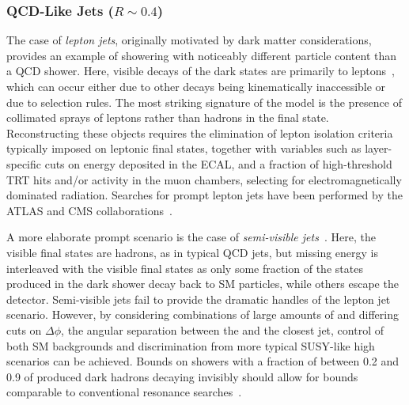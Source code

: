 \subsubsection{QCD-Like Jets ($R \sim 0.4$)} %
\label{sec:darkshowerthinjet}

The case of \emph{lepton jets}, originally motivated by dark matter considerations, provides an example of showering with noticeably different particle content than a QCD shower. Here, visible decays of the dark states are primarily to leptons~\cite{Falkowski:2010cm,Falkowski:2010gv}, which can occur either due to other decays being kinematically inaccessible or due to selection rules. The most striking signature of the model is the presence of collimated sprays of leptons rather than hadrons in the final state. Reconstructing these objects requires the elimination of lepton isolation criteria typically imposed on leptonic final states, together with variables such as layer-specific cuts on energy deposited in the ECAL, and a fraction of high-threshold TRT hits and/or activity in the muon chambers, selecting for electromagnetically dominated radiation. Searches for prompt lepton jets have been performed by the ATLAS and CMS collaborations~\cite{Chatrchyan:2011hr,Aad:2015sms}.

A more elaborate prompt scenario is the case of \emph{semi-visible jets}~\cite{Cohen:2015toa}. Here, the visible final states are hadrons, as in typical QCD jets, but missing energy is interleaved with the visible final states as only some fraction of the states produced in the dark shower decay back to SM particles, while others escape the detector. Semi-visible jets fail to provide the dramatic handles of the lepton jet scenario. However, by considering combinations of large amounts of \MET and differing cuts on $\Delta\phi$, the angular separation between the \MET and the closest jet, control of both SM backgrounds and discrimination from more typical SUSY-like high \MET scenarios can be achieved. Bounds on showers with a fraction of between 0.2 and 0.9 of produced dark hadrons decaying invisibly should allow for bounds comparable to conventional resonance searches~\cite{Cohen:2017pzm}.

